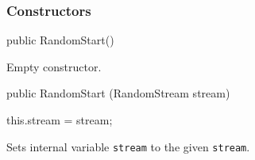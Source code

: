 \subsubsection*{Constructors}
\begin{code}

   public RandomStart() \begin{hide} {
   }
   \end{hide}
\end{code}
\begin{tabb}
   Empty constructor.
\end{tabb}
\begin{code}

   public RandomStart (RandomStream stream) \begin{hide} {
       this.stream = stream;
   }
   \end{hide}
\end{code}
\begin{tabb}
   Sets internal variable \texttt{stream} to the given
   \texttt{stream}.
\end{tabb}
\begin{htmlonly}
\end{htmlonly}

